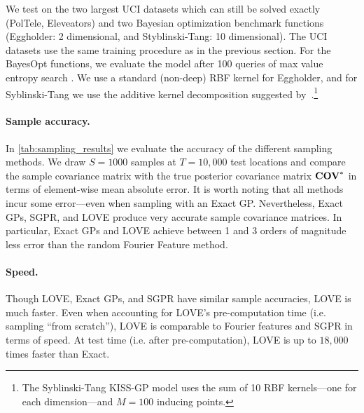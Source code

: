 We test on the two largest UCI datasets which can still be solved exactly (PolTele, Eleveators) and two Bayesian optimization benchmark functions (Eggholder: 2 dimensional, and Styblinski-Tang: 10 dimensional).
The UCI datasets use the same training procedure as in the previous section.
For the BayesOpt functions, we evaluate the model after 100 queries of max value entropy search \cite{wang2017max}.
We use a standard (non-deep) RBF kernel for Eggholder, and for Syblinski-Tang we use the additive kernel decomposition suggested by~\citet{kandasamy2015high}.\footnote{
  The Syblinski-Tang KISS-GP model uses the sum of 10 RBF kernels---one for each dimension---and $M=100$ inducing points.
}

\paragraph{Sample accuracy.}
In \cref{tab:sampling_results} we evaluate the accuracy of the different sampling methods.
We draw $S\!=\!1000$ samples at $T\!=\!10,\!000$ test locations and compare the sample covariance matrix with the true posterior covariance matrix $\textbf{COV}^*$ in terms of element-wise mean absolute error.
It is worth noting that all methods incur some error---even when sampling with an Exact GP.
Nevertheless, Exact GPs, SGPR, and LOVE{} produce very accurate sample covariance matrices.
In particular, Exact GPs and LOVE{} achieve between 1 and 3 orders of magnitude less error than the random Fourier Feature method.

\paragraph{Speed.}
Though LOVE{}, Exact GPs, and SGPR have similar sample accuracies, LOVE{} is much faster.
Even when accounting for LOVE's pre-computation time (i.e. sampling ``from scratch''), LOVE{} is comparable to Fourier features and SGPR in terms of speed.
At test time (i.e. after pre-computation), LOVE{} is up to $18,\!000$ times faster than Exact.

